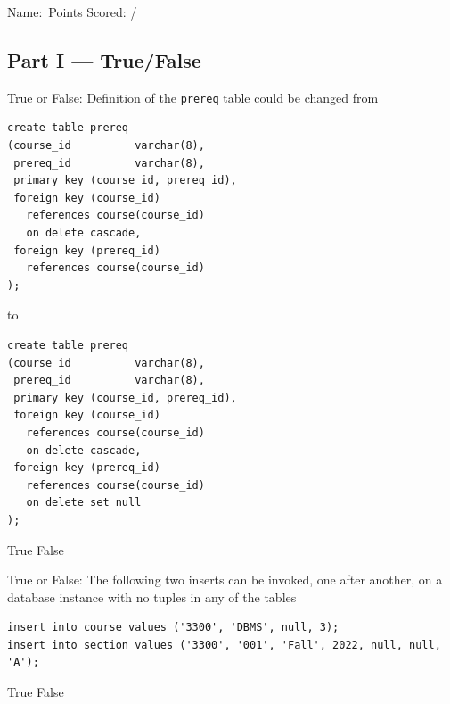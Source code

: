 \documentclass[12pt, addpoints]{exam}
\begin{document}
\noindent Name:\ \makebox[3in]{\hrulefill}\hfill Points Scored: \underline{\hspace{3em}} / \numpoints
\begin{questions}

\section*{Part I — True/False}

\begin{minipage}{\linewidth}
\question[2]
True or False: Definition of the \texttt{prereq} table could be changed from\par\vspace{0.5em}
\begin{verbatim}
create table prereq
(course_id          varchar(8),
 prereq_id          varchar(8),
 primary key (course_id, prereq_id),
 foreign key (course_id) 
   references course(course_id)
   on delete cascade,
 foreign key (prereq_id)
   references course(course_id)
);
\end{verbatim}
\vspace{0.5em}
to\par\vspace{0.5em}
\begin{verbatim}
create table prereq
(course_id          varchar(8),
 prereq_id          varchar(8),
 primary key (course_id, prereq_id),
 foreign key (course_id) 
   references course(course_id)
   on delete cascade,
 foreign key (prereq_id)
   references course(course_id)
   on delete set null
);
\end{verbatim}
\vspace{0.5em}
\begin{checkboxes}
    \choice True
    \CorrectChoice False
\end{checkboxes}
\end{minipage}

\begin{minipage}{\linewidth}
\question[2]
True or False: The following two inserts can be invoked, one after another, on a database instance with no tuples in any of the tables\par\vspace{0.5em}
\begin{verbatim}
insert into course values ('3300', 'DBMS', null, 3);
insert into section values ('3300', '001', 'Fall', 2022, null, null, 'A');
\end{verbatim}
\begin{checkboxes}
    \CorrectChoice True
    \choice False
\end{checkboxes}
\end{minipage}


\end{questions}
\end{document}
